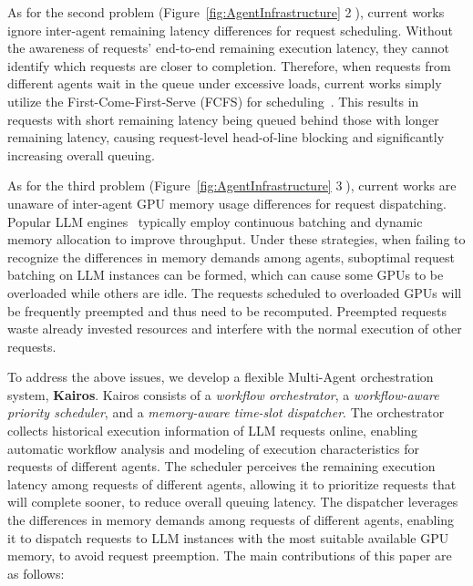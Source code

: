 \documentclass[sigplan,nonacm]{acmart}
\newcommand{\system}{Kairos}
\begin{document}
  
As for the second problem (Figure~\ref{fig:AgentInfrastructure} \textcircled{2}), current works ignore inter-agent remaining latency differences for request scheduling. 
Without the awareness of requests' end-to-end remaining execution latency, they cannot identify which requests are closer to completion. 
Therefore, when requests from different agents wait in the queue under excessive loads, current works simply utilize the First-Come-First-Serve (FCFS) for scheduling~\cite{kwon2023efficient,10.5555/3691938.3691988}.
This results in requests with short remaining latency being queued behind those with longer remaining latency, causing request-level head-of-line blocking and significantly increasing overall queuing.


As for the third problem (Figure~\ref{fig:AgentInfrastructure} \textcircled{3}), 
current works are unaware of inter-agent GPU memory usage differences for request dispatching. 
Popular LLM engines~\cite{kwon2023efficient,zheng2024sglangefficientexecutionstructured} typically employ continuous batching and dynamic memory allocation to improve throughput.
Under these strategies, when failing to recognize the differences in memory demands among agents,  
suboptimal request batching on LLM instances can be formed, which can cause some GPUs to be overloaded while others are idle. The requests scheduled to overloaded GPUs will be frequently preempted and thus need to be recomputed. Preempted requests waste already invested resources and interfere with the normal execution of other requests.



To address the above issues, we develop a flexible Multi-Agent orchestration system, \textbf{\system{}}.
\system{} consists of a \textit{workflow orchestrator}, a \textit{workflow-aware priority scheduler}, and a \textit{memory-aware time-slot dispatcher}.
The orchestrator collects historical execution information of LLM requests online, enabling automatic workflow analysis and modeling of execution characteristics for requests of different agents. 
The scheduler perceives the remaining execution latency among requests of different agents, allowing it to prioritize requests that will complete sooner, to reduce overall queuing latency. 
The dispatcher leverages the differences in memory demands among requests of different agents, enabling it to dispatch requests to LLM instances with the most suitable available GPU memory, to avoid request preemption. 
The main contributions of this paper are as follows:
\end{document}
